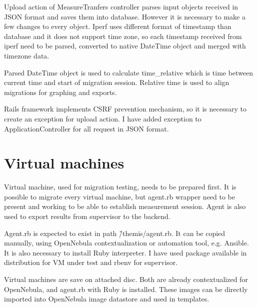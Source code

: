 Upload action of MeasureTranfers controller parses input objects received in \Ac{JSON} format and saves them into database. However it is necessary to make a few changes to every object. Iperf uses different format of timestamp than database and it does not support time zone, so each timestamp received from iperf need to be parsed, converted to native DateTime object and merged with timezone data. 

Parsed DateTime object is used to calculate time\_relative which is time between current time and start of migration session. Relative time is used to align migrations for graphing and exports.

Rails framework implements \Ac{CSRF} prevention mechanism, so it is necessary to create an exception for upload action. I have added exception to ApplicationController for all request in \Ac{JSON} format.


\section{Virtual machines}
Virtual machine, used for migration testing, needs to be prepared first. It is possible to migrate every virtual machine, but agent.rb wrapper need to be present and working to be able to establish measurement session. Agent is also used to export results from supervisor to the backend.

Agent.rb is expected to exist in path {\~/themis/agent.rb}. It can be copied manually, using OpenNebula contextualization or automation tool, e.g. Ansible. It is also necessary to install Ruby interpreter. I have used package available in distribution for \Ac{VM} under test and rbenv for supervisor.

Virtual machines are save on attached disc. Both are already contextualized for OpenNebula, and agent.rb with Ruby is installed. These images can be directly imported into OpenNebula image datastore and used in templates.

